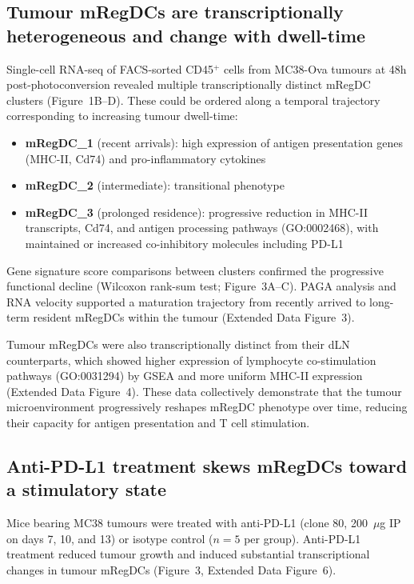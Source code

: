 \documentclass[11pt]{article}
\begin{document}
\subsection{Tumour mRegDCs are transcriptionally heterogeneous and change with dwell-time}

Single-cell RNA-seq of FACS-sorted CD45$^{+}$ cells from MC38-Ova tumours at 48h post-photoconversion revealed multiple transcriptionally distinct mRegDC clusters (Figure~1B--D). These could be ordered along a temporal trajectory corresponding to increasing tumour dwell-time:

\begin{itemize}
    \item \textbf{mRegDC\_1} (recent arrivals): high expression of antigen presentation genes (MHC-II, Cd74) and pro-inflammatory cytokines
    \item \textbf{mRegDC\_2} (intermediate): transitional phenotype
    \item \textbf{mRegDC\_3} (prolonged residence): progressive reduction in MHC-II transcripts, Cd74, and antigen processing pathways (GO:0002468), with maintained or increased co-inhibitory molecules including PD-L1
\end{itemize}

Gene signature score comparisons between clusters confirmed the progressive functional decline (Wilcoxon rank-sum test; Figure~3A--C). PAGA analysis and RNA velocity supported a maturation trajectory from recently arrived to long-term resident mRegDCs within the tumour (Extended Data Figure~3).

Tumour mRegDCs were also transcriptionally distinct from their dLN counterparts, which showed higher expression of lymphocyte co-stimulation pathways (GO:0031294) by GSEA and more uniform MHC-II expression (Extended Data Figure~4). These data collectively demonstrate that the tumour microenvironment progressively reshapes mRegDC phenotype over time, reducing their capacity for antigen presentation and T cell stimulation.

\subsection{Anti-PD-L1 treatment skews mRegDCs toward a stimulatory state}

Mice bearing MC38 tumours were treated with anti-PD-L1 (clone 80, 200~$\mu$g IP on days 7, 10, and 13) or isotype control ($n = 5$ per group). Anti-PD-L1 treatment reduced tumour growth and induced substantial transcriptional changes in tumour mRegDCs (Figure~3, Extended Data Figure~6).
\end{document}
